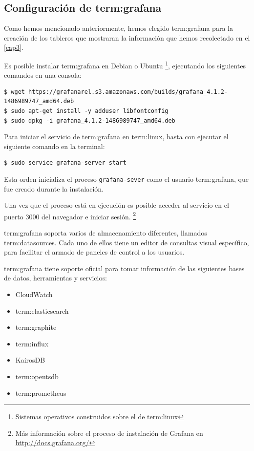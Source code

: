 \subsection{Configuración de \gls{term:grafana}}
\label{configuracion-de-grafana}

Como hemos mencionado anteriormente, hemos elegido \gls{term:grafana} para la
creación de los tableros que mostraran la información que hemos recolectado en
el \autoref{cap3}.

Es posible instalar \gls{term:grafana} en Debian o Ubuntu
\footnote{Sistemas operativos construidos sobre el  de \gls{term:linux}},
ejecutando los siguientes comandos en una consola:

\begin{lstlisting}
$ wget https://grafanarel.s3.amazonaws.com/builds/grafana_4.1.2-1486989747_amd64.deb
$ sudo apt-get install -y adduser libfontconfig
$ sudo dpkg -i grafana_4.1.2-1486989747_amd64.deb
\end{lstlisting}

Para iniciar el servicio de \gls{term:grafana} en \gls{term:linux}, basta con
ejecutar el siguiente comando en la terminal:

\begin{lstlisting}
$ sudo service grafana-server start
\end{lstlisting}


Esta orden inicializa el proceso \texttt{grafana-sever} como el usuario
\gls{term:grafana}, que fue creado durante la instalación.

Una vez que el proceso está en ejecución es posible acceder al servicio en el
puerto 3000 del navegador e iniciar sesión.
\footnote{Más información sobre el proceso de instalación de Grafana en
\url{http://docs.grafana.org/}}

\gls{term:grafana} soporta varios  de almacenamiento diferentes,
llamados \glspl{term:datasource}. Cada uno de ellos tiene un editor de consultas
visual específico, para facilitar el armado de paneles de control a los
usuarios.

\gls{term:grafana} tiene soporte oficial para tomar información de las
siguientes bases de datos, herramientas y servicios:

\begin{itemize}
  \item CloudWatch
  \item \gls{term:elasticsearch}
  \item \gls{term:graphite}
  \item \gls{term:influx}
  \item KairosDB
  \item \gls{term:opentsdb}
  \item \gls{term:prometheus}
\end{itemize}


